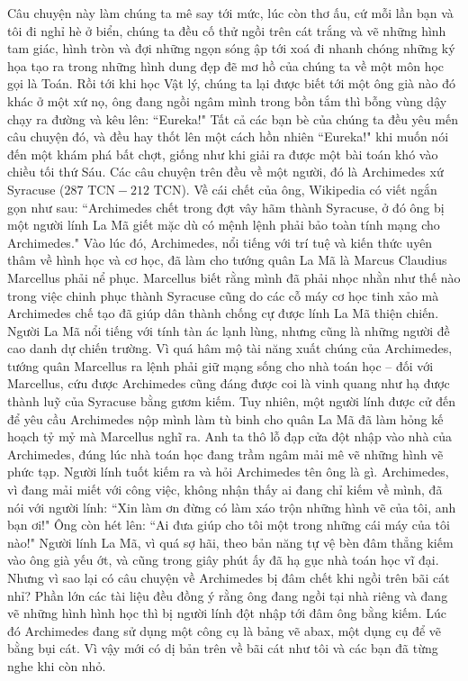 \begin{multicols}{2}
	Câu chuyện này làm chúng ta mê say tới mức, lúc còn thơ ấu, cứ mỗi lần bạn và tôi đi nghỉ hè ở biển, chúng ta đều cố thử ngồi trên cát trắng và vẽ những hình tam giác, hình tròn và đợi những ngọn sóng ập tới xoá đi nhanh chóng những ký họa tạo ra trong những hình dung đẹp đẽ mơ hồ của chúng ta về một môn học gọi là Toán.
	\vskip 0.1cm
	Rồi tới khi học Vật lý, chúng ta lại được biết tới một ông già nào đó khác ở một xứ nọ, ông đang ngồi ngâm mình trong bồn tắm thì bỗng vùng dậy chạy ra đường và kêu lên: ``Eureka!" Tất cả các bạn bè của chúng ta đều yêu mến câu chuyện đó, và đều hay thốt lên một cách hồn nhiên ``Eureka!" khi muốn nói đến một khám phá bất chợt, giống như khi giải ra được một bài toán khó vào chiều tối thứ Sáu.
	\vskip 0.1cm
	Các câu chuyện trên đều về một người, đó là Archimedes xứ Syracuse ($287 \text{ TCN}-212 \text{ TCN}$). Về cái chết của ông, Wikipedia có viết ngắn gọn như sau: ``Archimedes chết trong đợt vây hãm thành Syracuse, ở đó ông bị một người lính La Mã giết mặc dù có mệnh lệnh phải bảo toàn tính mạng cho Archimedes." Vào lúc đó, Archimedes,  nổi tiếng với trí tuệ và kiến thức uyên thâm về hình học và cơ học, đã làm cho tướng quân La Mã là Marcus Claudius Marcellus phải nể phục. Marcellus biết rằng mình đã phải nhọc nhằn như thế nào trong việc chinh phục thành Syracuse cũng do các cỗ máy cơ học tinh xảo mà Archimedes chế tạo đã giúp dân thành chống cự được lính La Mã thiện chiến. Người La Mã nổi tiếng với tính tàn ác lạnh lùng, nhưng cũng là những người đề cao danh dự chiến trường. Vì quá hâm mộ tài năng xuất chúng của Archimedes, tướng quân Marcellus ra lệnh phải giữ mạng sống cho nhà toán học -- đối với Marcellus, cứu được Archimedes cũng đáng được coi là vinh quang như hạ được thành luỹ của Syracuse bằng gươm kiếm.
	\vskip 0.1cm
	Tuy nhiên, một người lính được cử đến để yêu cầu Archimedes nộp mình làm tù binh cho quân La Mã đã làm hỏng kế hoạch tỷ mỷ mà Marcellus nghĩ ra. Anh ta thô lỗ đạp cửa đột nhập vào nhà của Archimedes, đúng lúc  nhà toán học đang trầm ngâm mải mê vẽ những hình vẽ phức tạp. Người lính tuốt kiếm ra và hỏi Archimedes tên ông là gì. Archimedes, vì đang mải miết với công việc, không nhận thấy ai đang chỉ kiếm về mình, đã nói với người lính: ``Xin làm ơn đừng có làm xáo trộn những hình vẽ của tôi, anh bạn ơi!" Ông còn hét lên: ``Ai đưa giúp cho tôi một trong những cái máy của tôi nào!" Người lính La Mã, vì quá sợ hãi, theo bản năng tự vệ bèn đâm thẳng kiếm vào ông già yếu ớt, và cũng trong giây phút ấy đã hạ gục nhà toán học vĩ đại.
	\vskip 0.1cm
	Nhưng vì sao lại có câu chuyện về Archimedes bị đâm chết khi ngồi trên bãi cát nhỉ? Phần lớn các tài liệu đều đồng ý rằng ông đang ngồi tại nhà riêng và đang vẽ những hình hình học thì bị người lính đột nhập tới đâm ông bằng kiếm. Lúc đó Archimedes đang sử dụng một công cụ là bảng vẽ abax, một dụng cụ để vẽ bằng bụi cát. Vì vậy mới có dị bản trên về bãi cát như tôi và các bạn đã từng nghe khi còn nhỏ.

\end{multicols}
